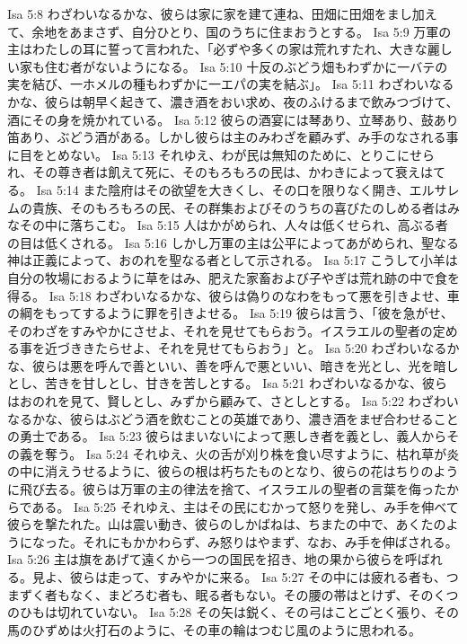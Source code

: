 Isa 5:8  わざわいなるかな、彼らは家に家を建て連ね、田畑に田畑をまし加えて、余地をあまさず、自分ひとり、国のうちに住まおうとする。
Isa 5:9  万軍の主はわたしの耳に誓って言われた、「必ずや多くの家は荒れすたれ、大きな麗しい家も住む者がないようになる。
Isa 5:10  十反のぶどう畑もわずかに一バテの実を結び、一ホメルの種もわずかに一エパの実を結ぶ」。
Isa 5:11  わざわいなるかな、彼らは朝早く起きて、濃き酒をおい求め、夜のふけるまで飲みつづけて、酒にその身を焼かれている。
Isa 5:12  彼らの酒宴には琴あり、立琴あり、鼓あり笛あり、ぶどう酒がある。しかし彼らは主のみわざを顧みず、み手のなされる事に目をとめない。
Isa 5:13  それゆえ、わが民は無知のために、とりこにせられ、その尊き者は飢えて死に、そのもろもろの民は、かわきによって衰えはてる。
Isa 5:14  また陰府はその欲望を大きくし、その口を限りなく開き、エルサレムの貴族、そのもろもろの民、その群集およびそのうちの喜びたのしめる者はみなその中に落ちこむ。
Isa 5:15  人はかがめられ、人々は低くせられ、高ぶる者の目は低くされる。
Isa 5:16  しかし万軍の主は公平によってあがめられ、聖なる神は正義によって、おのれを聖なる者として示される。
Isa 5:17  こうして小羊は自分の牧場におるように草をはみ、肥えた家畜および子やぎは荒れ跡の中で食を得る。
Isa 5:18  わざわいなるかな、彼らは偽りのなわをもって悪を引きよせ、車の綱をもってするように罪を引きよせる。
Isa 5:19  彼らは言う、「彼を急がせ、そのわざをすみやかにさせよ、それを見せてもらおう。イスラエルの聖者の定める事を近づききたらせよ、それを見せてもらおう」と。
Isa 5:20  わざわいなるかな、彼らは悪を呼んで善といい、善を呼んで悪といい、暗きを光とし、光を暗しとし、苦きを甘しとし、甘きを苦しとする。
Isa 5:21  わざわいなるかな、彼らはおのれを見て、賢しとし、みずから顧みて、さとしとする。
Isa 5:22  わざわいなるかな、彼らはぶどう酒を飲むことの英雄であり、濃き酒をまぜ合わせることの勇士である。
Isa 5:23  彼らはまいないによって悪しき者を義とし、義人からその義を奪う。
Isa 5:24  それゆえ、火の舌が刈り株を食い尽すように、枯れ草が炎の中に消えうせるように、彼らの根は朽ちたものとなり、彼らの花はちりのように飛び去る。彼らは万軍の主の律法を捨て、イスラエルの聖者の言葉を侮ったからである。
Isa 5:25  それゆえ、主はその民にむかって怒りを発し、み手を伸べて彼らを撃たれた。山は震い動き、彼らのしかばねは、ちまたの中で、あくたのようになった。それにもかかわらず、み怒りはやまず、なお、み手を伸ばされる。
Isa 5:26  主は旗をあげて遠くから一つの国民を招き、地の果から彼らを呼ばれる。見よ、彼らは走って、すみやかに来る。
Isa 5:27  その中には疲れる者も、つまずく者もなく、まどろむ者も、眠る者もない。その腰の帯はとけず、そのくつのひもは切れていない。
Isa 5:28  その矢は鋭く、その弓はことごとく張り、その馬のひずめは火打石のように、その車の輪はつむじ風のように思われる。
